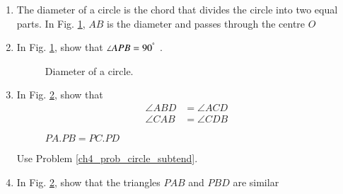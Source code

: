 \begin{enumerate}[label=\arabic*.,ref=\thesubsection.\theenumi]
%
\item
	The diameter of a circle is the chord that divides the circle into two equal parts. In Fig. \ref{ch4_circle_dia}, $AB$ is the diameter and passes through the centre $O$

%
\item
In Fig. \ref{ch4_circle_dia}, show that $\angle APB = 90^{\degree}$ .

%
\begin{figure}[!ht]
	\begin{center}
		
		\resizebox{\columnwidth}{!}{}
	\end{center}
	\caption{Diameter of a circle.}
	\label{ch4_circle_dia}	
\end{figure}
\item
	In Fig. \ref{ch4_chord_product}, show that 
	\begin{equation}
	\begin{split}
\angle ABD &= \angle ACD \\
\angle CAB &= \angle CDB	
	\end{split}
	\end{equation}

\begin{figure}[!ht]
	\begin{center}
		
		\resizebox{\columnwidth}{!}{}
	\end{center}
	\caption{$PA.PB = PC.PD$}
	\label{ch4_chord_product}	
\end{figure}
%
%
\solution Use Problem \ref{ch4_prob_circle_subtend}.
%
\item
	In Fig. \ref{ch4_chord_product}, show that the triangles $PAB$ and $PBD$ are similar


\end{enumerate}
